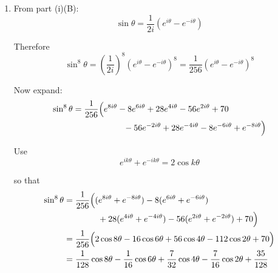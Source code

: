 \documentclass[leqno]{article}
\begin{document}
\begin{enumerate}[
  label=\textbf{\arabic*.},
  leftmargin=*,
  topsep=0pt,
  partopsep=0pt,
  parsep=0pt
]
\begin{djsSolution}
\begin{enumerate}[label=\textbf{(\roman*)}]
  Equating real parts gives
  \begin{align*}
  \cos 8\theta
  &=\cos^8\theta-28\cos^6\theta\sin^2\theta+70\cos^4\theta\sin^4\theta \\
  &\qquad -28\cos^2\theta\sin^6\theta+\sin^8\theta
  \end{align*}

  Since \(\cos^2\theta=1-\sin^2\theta\), let \(x=\sin^2\theta\). Then
  \begin{align*}
  \cos 8\theta
  &=(1-x)^4-28(1-x)^3x+70(1-x)^2x^2-28(1-x)x^3+x^4 \\
  &=(1-4x+6x^2-4x^3+x^4) \\
  &\qquad -28(x-3x^2+3x^3-x^4) \\
  &\qquad +70(x^2-2x^3+x^4)-28(x^3-x^4)+x^4 \\
  &=1-32x+160x^2-256x^3+128x^4
  \end{align*}

  Substitute back \(x=\sin^2\theta\):
  \[
  \cos 8\theta \equiv 128\sin^8\theta-256\sin^6\theta+160\sin^4\theta-32\sin^2\theta+1
  \]

  Hence
  \[
  a=128,\quad b=-256,\quad c=160,\quad d=-32,\quad e=1
  \]

  \item From part (i)(B):
  \[
  \sin\theta=\frac{1}{2i}\left(e^{i\theta}-e^{-i\theta}\right)
  \]

  Therefore
  \[
  \sin^8\theta=\left(\frac{1}{2i}\right)^8\left(e^{i\theta}-e^{-i\theta}\right)^8
  =\frac{1}{256}\left(e^{i\theta}-e^{-i\theta}\right)^8
  \]

  Now expand:
  \begin{align*}
  \sin^8\theta
  &=\frac{1}{256}\Bigl(
  e^{8i\theta}-8e^{6i\theta}+28e^{4i\theta}-56e^{2i\theta}+70 \\
  &\qquad\qquad\qquad -56e^{-2i\theta}+28e^{-4i\theta}-8e^{-6i\theta}+e^{-8i\theta}
  \Bigr)
  \end{align*}

  Use
  \[
  e^{ik\theta}+e^{-ik\theta}=2\cos k\theta
  \]

  so that
  \begin{align*}
  \sin^8\theta
  &=\frac{1}{256}\Bigl(
  (e^{8i\theta}+e^{-8i\theta})
  -8(e^{6i\theta}+e^{-6i\theta}) \\
  &\qquad\qquad
  +28(e^{4i\theta}+e^{-4i\theta})
  -56(e^{2i\theta}+e^{-2i\theta})
  +70
  \Bigr) \\
  &=\frac{1}{256}\Bigl(
  2\cos 8\theta-16\cos 6\theta+56\cos 4\theta-112\cos 2\theta+70
  \Bigr) \\
  &=\frac{1}{128}\cos 8\theta-\frac{1}{16}\cos 6\theta+\frac{7}{32}\cos 4\theta-\frac{7}{16}\cos 2\theta+\frac{35}{128}
  \end{align*}


\end{enumerate}
\end{djsSolution}
\end{enumerate}
\end{document}
